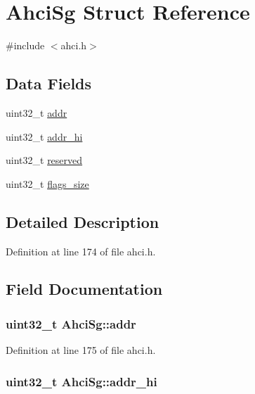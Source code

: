 \hypertarget{structAhciSg}{}\section{Ahci\+Sg Struct Reference}
\label{structAhciSg}


{\ttfamily \#include $<$ahci.\+h$>$}

\subsection*{Data Fields}
\begin{DoxyCompactItemize}
\item 
uint32\+\_\+t \hyperlink{structAhciSg_af1945cb85b6dd32489f4133bccf2dd17}{addr}
\item 
uint32\+\_\+t \hyperlink{structAhciSg_a87636aaae75b27b674480a3d7af90768}{addr\+\_\+hi}
\item 
uint32\+\_\+t \hyperlink{structAhciSg_a745f35097b6dd3d2cc3f51de60338691}{reserved}
\item 
uint32\+\_\+t \hyperlink{structAhciSg_a280cf97b5fb219dd638a79c9af2bf938}{flags\+\_\+size}
\end{DoxyCompactItemize}


\subsection{Detailed Description}


Definition at line 174 of file ahci.\+h.



\subsection{Field Documentation}
\subsubsection[{\texorpdfstring{addr}{addr}}]{\setlength{\rightskip}{0pt plus 5cm}uint32\+\_\+t Ahci\+Sg\+::addr}\hypertarget{structAhciSg_af1945cb85b6dd32489f4133bccf2dd17}{}\label{structAhciSg_af1945cb85b6dd32489f4133bccf2dd17}


Definition at line 175 of file ahci.\+h.

\subsubsection[{\texorpdfstring{addr\+\_\+hi}{addr_hi}}]{\setlength{\rightskip}{0pt plus 5cm}uint32\+\_\+t Ahci\+Sg\+::addr\+\_\+hi}\hypertarget{structAhciSg_a87636aaae75b27b674480a3d7af90768}{}\label{structAhciSg_a87636aaae75b27b674480a3d7af90768}


